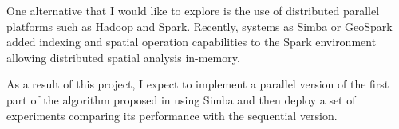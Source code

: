 \documentclass[a4paper, 12pt]{scrartcl}
\begin{document}
One alternative that I would like to explore is the use of distributed parallel platforms such as Hadoop and Spark.  Recently, systems as Simba \citep{simba} or GeoSpark \citep{GeoSpark} added indexing and spatial operation capabilities to the Spark environment allowing distributed spatial analysis in-memory.

As a result of this project, I expect to implement a parallel version of the first part of the algorithm proposed in \citep{vieira_-line_2009} using Simba and then deploy a set of experiments comparing its performance with the sequential version.
 



\end{document}

